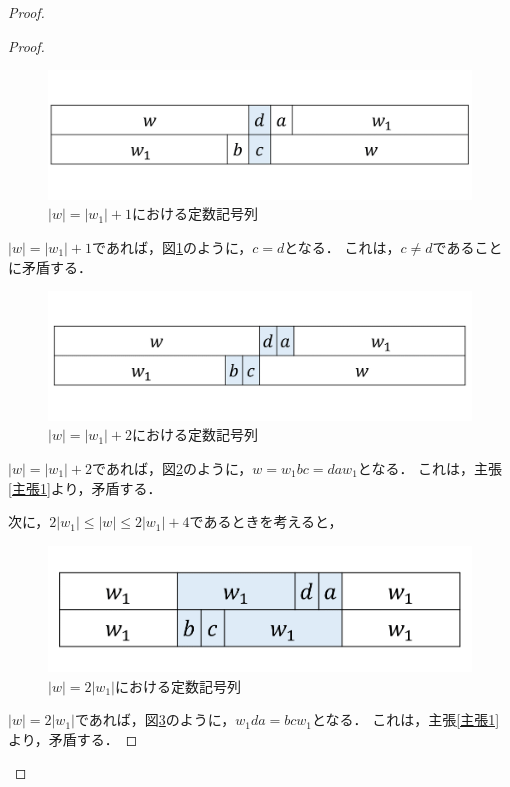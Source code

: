 \begin{proof}
\begin{proof}
\begin{figure}[H]
\includegraphics[width=\linewidth]{画像/追加部分8.png}
\caption{$|w| = |w_{1}|+1$における定数記号列}
\label{追加部分8}
\end{figure}

$|w|=|w_{1}|+1$であれば，図\ref{追加部分8}のように，$c=d$となる．
これは，$c \not = d$であることに矛盾する．

\begin{figure}[H]
\includegraphics[width=\linewidth]{画像/追加部分9.png}
\caption{$|w| = |w_{1}|+2$における定数記号列}
\label{追加部分9}
\end{figure}

$|w|=|w_{1}|+2$であれば，図\ref{追加部分9}のように，$w=w_{1}bc=daw_{1}$となる．
これは，主張\ref{主張1}より，矛盾する．

次に，$2|w_{1}| \le |w| \le 2|w_{1}|+4$であるときを考えると，

\begin{figure}[H]
\includegraphics[width=\linewidth]{画像/追加部分14.png}
\caption{$|w| = 2|w_{1}|$における定数記号列}
\label{追加部分14}
\end{figure}

$|w|=2|w_{1}|$であれば，図\ref{追加部分14}のように，$w_{1}da=bcw_{1}$となる．
これは，主張\ref{主張1}より，矛盾する．


\end{proof}
\end{proof}
